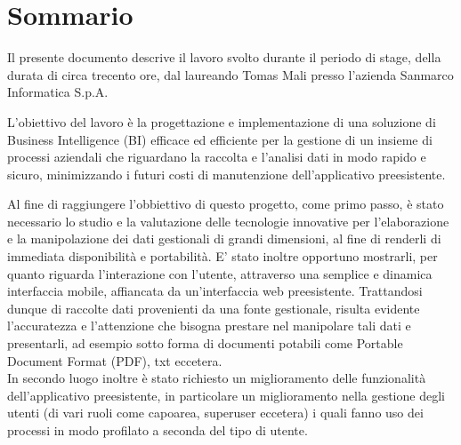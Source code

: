 
\cleardoublepage
{}
{}
\begingroup
\let\clearpage\relax
\let\cleardoublepage\relax
\let\cleardoublepage\relax

\chapter*{Sommario}

Il presente documento descrive il lavoro svolto durante il periodo di stage, della durata di circa trecento ore, dal laureando Tomas Mali presso l'azienda Sanmarco Informatica S.p.A.

L'obiettivo del lavoro è la progettazione e implementazione di una soluzione di \gls{Business Intelligence} (BI) efficace ed efficiente  per la gestione di un insieme di processi aziendali  che riguardano la raccolta e l'analisi dati in modo rapido e sicuro, minimizzando i futuri costi di manutenzione dell'applicativo preesistente.\

Al fine di raggiungere l'obbiettivo di questo progetto, come primo passo, è stato necessario lo studio e la valutazione delle tecnologie innovative  per l'elaborazione e la manipolazione dei dati gestionali di grandi dimensioni, al fine di renderli di immediata disponibilità e portabilità. E' stato inoltre opportuno mostrarli, per quanto riguarda l'interazione con l'utente, attraverso una semplice e dinamica interfaccia mobile, affiancata da un'interfaccia web preesistente. Trattandosi dunque di raccolte dati provenienti da una fonte gestionale, risulta evidente l'accuratezza e l'attenzione  che bisogna prestare nel manipolare tali dati e presentarli, ad esempio sotto forma di documenti potabili come Portable Document Format (\gls{PDF}), txt eccetera.\\ 
In secondo luogo inoltre è stato richiesto un miglioramento delle funzionalità dell'applicativo preesistente, in particolare un miglioramento nella gestione degli utenti (di vari ruoli come capoarea, superuser eccetera) i quali fanno uso dei processi  in modo profilato a seconda del tipo di utente.

%
%

\endgroup			

\vfill

